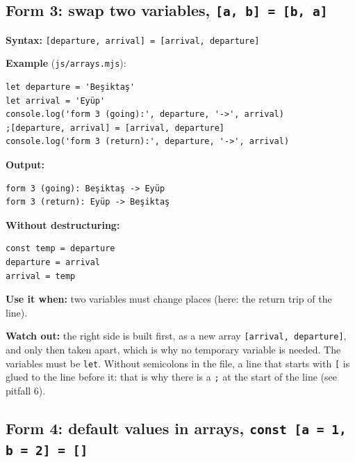 \documentclass[
  10pt,
]{article}
\begin{document}
\hypertarget{form-3-swap-two-variables-a-b--b-a}{%
\subsection{\texorpdfstring{Form 3: swap two variables,
\texttt{[\allowbreak{}a,\allowbreak{} b] =\allowbreak{} [\allowbreak{}b,\allowbreak{} a]}}{Form 3: swap two variables, }}\label{form-3-swap-two-variables-a-b--b-a}}

\textbf{Syntax:}
\texttt{[\allowbreak{}departure,\allowbreak{} arrival] =\allowbreak{} [\allowbreak{}arrival,\allowbreak{} departure]}

\textbf{Example} (\texttt{js/\allowbreak{}arrays.\allowbreak{}mjs}):

\begin{verbatim}
let departure = 'Beşiktaş'
let arrival = 'Eyüp'
console.log('form 3 (going):', departure, '->', arrival)
;[departure, arrival] = [arrival, departure]
console.log('form 3 (return):', departure, '->', arrival)
\end{verbatim}

\textbf{Output:}

\begin{verbatim}
form 3 (going): Beşiktaş -> Eyüp
form 3 (return): Eyüp -> Beşiktaş
\end{verbatim}

\textbf{Without destructuring:}

\begin{verbatim}
const temp = departure
departure = arrival
arrival = temp
\end{verbatim}

\textbf{Use it when:} two variables must change places (here: the return
trip of the line).

\textbf{Watch out:} the right side is built first, as a new array
\texttt{[\allowbreak{}arrival,\allowbreak{} departure]}, and only then
taken apart, which is why no temporary variable is needed. The variables
must be \texttt{let}. Without semicolons in the file, a line that starts
with \texttt{[\allowbreak{}} is glued to the line before it: that is why
there is a \texttt{;} at the start of the line (see pitfall 6).

\hypertarget{form-4-default-values-in-arrays-const-a--1-b--2--}{%
\subsection{\texorpdfstring{Form 4: default values in arrays,
\texttt{const [\allowbreak{}a =\allowbreak{} 1,\allowbreak{} b =\allowbreak{} 2] =\allowbreak{} [\allowbreak{}]}}{Form 4: default values in arrays, }}\label{form-4-default-values-in-arrays-const-a--1-b--2--}}
\end{document}
